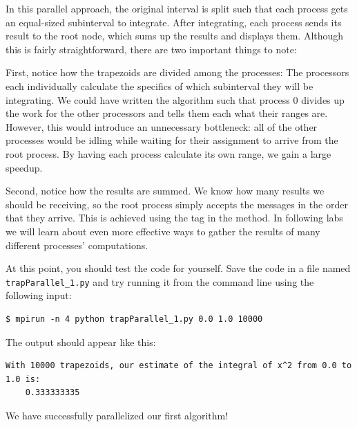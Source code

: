 

In this parallel approach, the original interval is split such that each process gets an equal-sized subinterval to integrate. After integrating, each process sends its result to the root node, which sums up the results and displays them. Although this is fairly straightforward, there are two important things to note:

First, notice how the trapezoids are divided among the processes: The processors each individually calculate the specifics of which subinterval they will be integrating. We could have written the algorithm such that process 0 divides up the work for the other processors and tells them each what their ranges are. However, this would introduce an unnecessary bottleneck: all of the other processes would be idling while waiting for their assignment to arrive from the root process. By having each process calculate its own range, we gain a large speedup.

Second, notice how the results are summed. We know how many results we should be receiving, so the root process simply accepts the messages in the order that they arrive. This is achieved using the tag  in the  method. In following labs we will learn about even more effective ways to gather the results of many different processes' computations.


At this point, you should test the code for yourself. Save the code in a file named \texttt{trapParallel\_1.py} and try running it from the command line using the following input:
\begin{lstlisting}[style=ShellInput]
$ mpirun -n 4 python trapParallel_1.py 0.0 1.0 10000
\end{lstlisting}
The output should appear like this:
\begin{lstlisting}[style=ShellOutput]
With 10000 trapezoids, our estimate of the integral of x^2 from 0.0 to 1.0 is:
    0.333333335
\end{lstlisting}
We have successfully parallelized our first algorithm!



